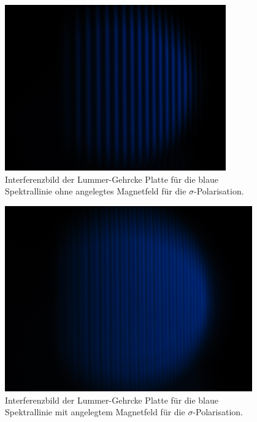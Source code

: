 \begin{figure}[h!]
  \centering
  \includegraphics[width=0.85\textwidth]{data/temp/blau_ohneB_0.JPG}
  \caption{Interferenzbild der Lummer-Gehrcke Platte für die blaue Spektrallinie ohne angelegtes Magnetfeld für die $\sigma$-Polarisation.}
  \label{fig:blauOhneB0}
\end{figure}
\begin{figure}[h!]
  \centering
  \includegraphics[width=0.95\textwidth]{data/temp/blau_mitB_0.JPG}
  \caption{Interferenzbild der Lummer-Gehrcke Platte für die blaue Spektrallinie mit angelegtem Magnetfeld für die $\sigma$-Polarisation.}
  \label{fig:blauMitB0}
\end{figure}

